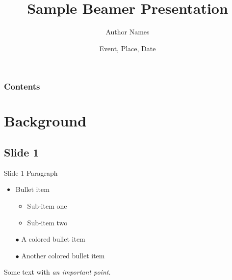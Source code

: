 \documentclass[compress,ignorenonframetext]{beamer}
\title{Sample Beamer Presentation}
\author{Author Names}
\institute{Company or Institute}
\date{Event, Place, Date}
\begin{document}

\begin{frame}[plain]
\titlepage %
\addtocounter{framenumber}{-1}
\end{frame}

\begin{frame}
\frametitle{Contents}%
\tableofcontents%
\end{frame}

\section{Background}

\subsection{Slide 1}
\begin{frame}{Slide 1}
Paragraph
\begin{itemize}
\item Bullet item
	\begin{itemize}
	\item Sub-item one
	\item Sub-item two
	\end{itemize}
\item[\color{darkgreen} $\bullet$] A colored bullet item
\item[\color{darkred} $\bullet$] Another colored bullet item
\end{itemize}

Some text with {\em an important point}.

\end{frame}
\end{document}
